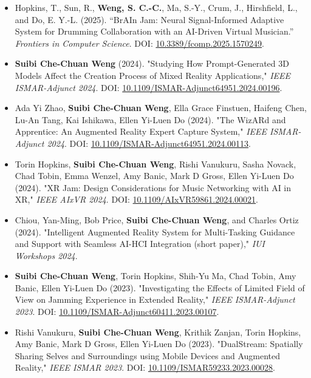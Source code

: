 \begin{itemize}
 \item Hopkins, T., Sun, R., \textbf{Weng, S. C.-C.}, Ma, S.-Y., Crum, J., Hirshfield, L., and Do, E. Y.-L. (2025). ``BrAIn Jam: Neural Signal-Informed Adaptive System for Drumming Collaboration with an AI-Driven Virtual Musician.'' \textit{Frontiers in Computer Science}.
DOI: \href{https://doi.org/10.3389/fcomp.2025.1570249}{10.3389/fcomp.2025.1570249}.

    \item \textbf{Suibi Che-Chuan Weng} (2024). "Studying How Prompt-Generated 3D Models Affect the Creation Process of Mixed Reality Applications," \textit{IEEE ISMAR-Adjunct 2024}.
DOI: \href{https://doi.org/10.1109/ISMAR-Adjunct64951.2024.00196}{10.1109/ISMAR-Adjunct64951.2024.00196}.
    
    \item Ada Yi Zhao, \textbf{Suibi Che-Chuan Weng}, Ella Grace Finstuen, Haifeng Chen, Lu-An Tang, Kai Ishikawa, Ellen Yi-Luen Do (2024). "The WizARd and Apprentice: An Augmented Reality Expert Capture System," \textit{IEEE ISMAR-Adjunct 2024}.
DOI: \href{https://doi.org/10.1109/ISMAR-Adjunct64951.2024.00113}{10.1109/ISMAR-Adjunct64951.2024.00113}.
  
    \item Torin Hopkins, \textbf{Suibi Che-Chuan Weng}, Rishi Vanukuru, Sasha Novack, Chad Tobin, Emma Wenzel, Amy Banic, Mark D Gross, Ellen Yi-Luen Do (2024). "XR Jam: Design Considerations for Music Networking with AI in XR," \textit{IEEE AIxVR 2024}.
DOI: \href{https://doi.org/10.1109/AIxVR59861.2024.00021}{10.1109/AIxVR59861.2024.00021}.
    
    \item Chiou, Yan-Ming, Bob Price, \textbf{Suibi Che-Chuan Weng}, and Charles Ortiz (2024). "Intelligent Augmented Reality System for Multi-Tasking Guidance and Support with Seamless AI-HCI Integration (short paper)," \textit{IUI Workshops 2024}.
    
    \item \textbf{Suibi Che-Chuan Weng}, Torin Hopkins, Shih-Yu Ma, Chad Tobin, Amy Banic, Ellen Yi-Luen Do (2023). "Investigating the Effects of Limited Field of View on Jamming Experience in Extended Reality," \textit{IEEE ISMAR-Adjunct 2023}.
DOI: \href{https://doi.org/10.1109/ISMAR-Adjunct60411.2023.00107}{10.1109/ISMAR-Adjunct60411.2023.00107}.
    
    \item Rishi Vanukuru, \textbf{Suibi Che-Chuan Weng}, Krithik Zanjan, Torin Hopkins, Amy Banic, Mark D Gross, Ellen Yi-Luen Do (2023). "DualStream: Spatially Sharing Selves and Surroundings using Mobile Devices and Augmented Reality," \textit{IEEE ISMAR 2023}.
DOI: \href{https://doi.org/10.1109/ISMAR59233.2023.00028}{10.1109/ISMAR59233.2023.00028}.
    

\end{itemize}
